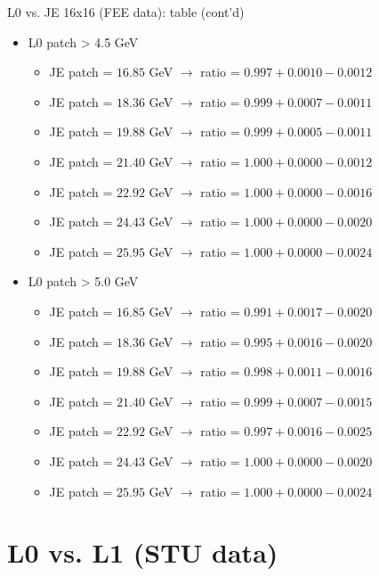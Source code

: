 \documentclass[xcolor={usenames,dvipsnames}]{beamer}
\begin{document}
\begin{frame}{L0 vs. JE 16x16 (FEE data): table (cont'd)}
\begin{itemize}
\item L0 patch > 4.5 GeV
\begin{itemize}
\item JE patch = $16.85$ GeV $\rightarrow$ ratio = $0.997 + 0.0010 - 0.0012$
\item JE patch = $18.36$ GeV $\rightarrow$ ratio = $0.999 + 0.0007 - 0.0011$
\item JE patch = $19.88$ GeV $\rightarrow$ ratio = $0.999 + 0.0005 - 0.0011$
\item JE patch = $21.40$ GeV $\rightarrow$ ratio = $1.000 + 0.0000 - 0.0012$
\item JE patch = $22.92$ GeV $\rightarrow$ ratio = $1.000 + 0.0000 - 0.0016$
\item JE patch = $24.43$ GeV $\rightarrow$ ratio = $1.000 + 0.0000 - 0.0020$
\item JE patch = $25.95$ GeV $\rightarrow$ ratio = $1.000 + 0.0000 - 0.0024$
\end{itemize}
\item L0 patch > 5.0 GeV
\begin{itemize}
\item JE patch = $16.85$ GeV $\rightarrow$ ratio = $0.991 + 0.0017 - 0.0020$
\item JE patch = $18.36$ GeV $\rightarrow$ ratio = $0.995 + 0.0016 - 0.0020$
\item JE patch = $19.88$ GeV $\rightarrow$ ratio = $0.998 + 0.0011 - 0.0016$
\item JE patch = $21.40$ GeV $\rightarrow$ ratio = $0.999 + 0.0007 - 0.0015$
\item JE patch = $22.92$ GeV $\rightarrow$ ratio = $0.997 + 0.0016 - 0.0025$
\item JE patch = $24.43$ GeV $\rightarrow$ ratio = $1.000 + 0.0000 - 0.0020$
\item JE patch = $25.95$ GeV $\rightarrow$ ratio = $1.000 + 0.0000 - 0.0024$
\end{itemize}
\end{itemize}
\end{frame}

\section{L0 vs. L1 (STU data)}
\end{document}
